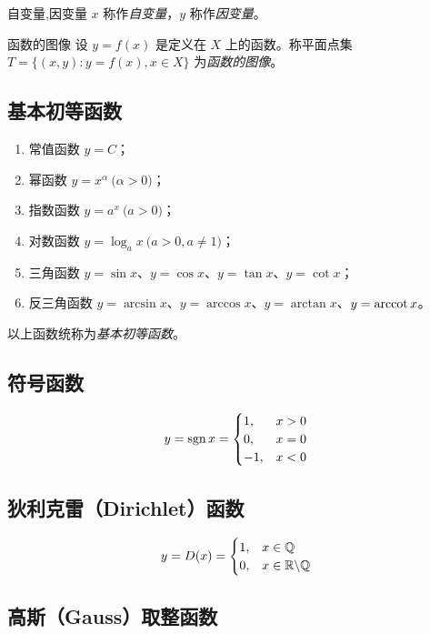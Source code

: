 \begin{definition}{自变量,因变量}
	$x$ 称作\emph{自变量}，$y$ 称作\emph{因变量}。
\end{definition}

\begin{definition}{函数的图像}
	设 $y = f(x)$ 是定义在 $X$ 上的函数。称平面点集 $T = \{(x, y): y = f(x), x \in X\}$ 为\emph{函数的图像}。
\end{definition}

\subsection{基本初等函数}

\begin{enumerate}
	\item 常值函数 $y = C$；
	\item 幂函数 $y = x^\alpha \pod{\alpha > 0}$；
	\item 指数函数 $y = a^x \pod{a > 0}$；
	\item 对数函数 $y = \log_a x \pod{a > 0, a \ne 1}$；
	\item 三角函数 $y = \sin x$、$y = \cos x$、$y = \tan x$、$y = \cot x$；
	\item 反三角函数 $y = \arcsin x$、$y = \arccos x$、$y = \arctan x$、$y = \mathop{\mathrm{arccot}} x$。
\end{enumerate}

以上函数统称为\emph{基本初等函数}。

\subsection{符号函数}

$$
y = \mathop{\mathrm{sgn}} x =
\begin{cases}
	1, & x > 0
	\\
	0, & x = 0
	\\
	-1, & x < 0
\end{cases}
$$

\subsection{狄利克雷（Dirichlet）函数}

$$
y = D(x) =
\begin{cases}
	1, & x \in \mathbb Q
	\\
	0, & x \in \mathbb R \backslash \mathbb Q
\end{cases}
$$

\subsection{高斯（Gauss）取整函数}

